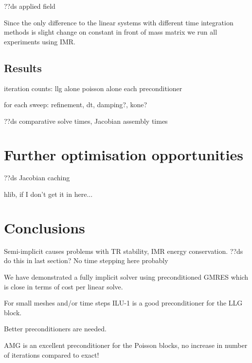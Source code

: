 ??ds applied field

Since the only difference to the linear systems with different time integration methods is slight change on constant in front of mass matrix we run all experiments using IMR.


\subsection{Results}


iteration counts:
llg alone
poisson alone
each preconditioner

for each sweep: refinement, dt, damping?, kone?


??ds comparative solve times, Jacobian assembly times


\section{Further optimisation opportunities}

??ds Jacobian caching

hlib, if I don't get it in here...



\section{Conclusions}

Semi-implicit causes problems with TR stability, IMR energy conservation. ??ds do this in last section? No time stepping here probably

We have demonstrated a fully implicit solver using preconditioned GMRES which is close in terms of cost per linear solve.

For small meshes and/or time steps ILU-1 is a good preconditioner for the LLG block.

Better preconditioners are needed.

AMG is an excellent preconditioner for the Poisson blocks, no increase in number of iterations compared to exact!



